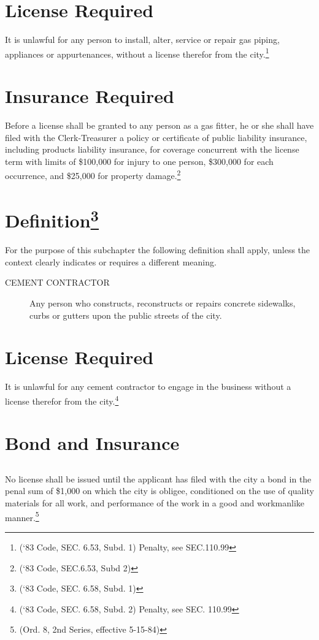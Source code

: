 
\setcounter{section}{14}
\section{License Required}
It is unlawful for any person to install, alter, service or repair gas piping, appliances or appurtenances, without a license therefor from the city.\footnote{(‘83 Code, SEC. 6.53, Subd. 1) Penalty, see SEC.110.99}
\section{Insurance Required}
Before a license shall be granted to any person as a gas fitter, he or she shall have filed with the Clerk-Treasurer a policy or certificate of public liability insurance, including products liability insurance, for coverage concurrent with the license term with limits of \$100,000 for injury to one person, \$300,000 for each occurrence, and \$25,000 for property damage.\footnote{(‘83 Code, SEC.6.53, Subd 2)}


\setcounter{section}{29}
\section{Definition\footnote{(‘83 Code, SEC. 6.58, Subd. 1)}}
For the purpose of this subchapter the following definition shall apply, unless the context clearly indicates or requires a different meaning.
\begin{description}
    \item[CEMENT CONTRACTOR] Any person who constructs, reconstructs or repairs concrete sidewalks, curbs or gutters upon the public streets of the city.
\end{description}
\section{License Required}
It is unlawful for any cement contractor to engage in the business without a license therefor from the city.\footnote{(‘83 Code, SEC. 6.58, Subd. 2)  Penalty, see SEC. 110.99}
\section{Bond and Insurance}
\subsection{}
No license shall be issued until the applicant has filed with the city a bond in the penal sum of \$1,000 on which the city is obligee, conditioned on the use of quality materials for all work, and performance of the work in a good and workmanlike manner.\footnote{(Ord. 8, 2nd Series, effective 5-15-84)}
